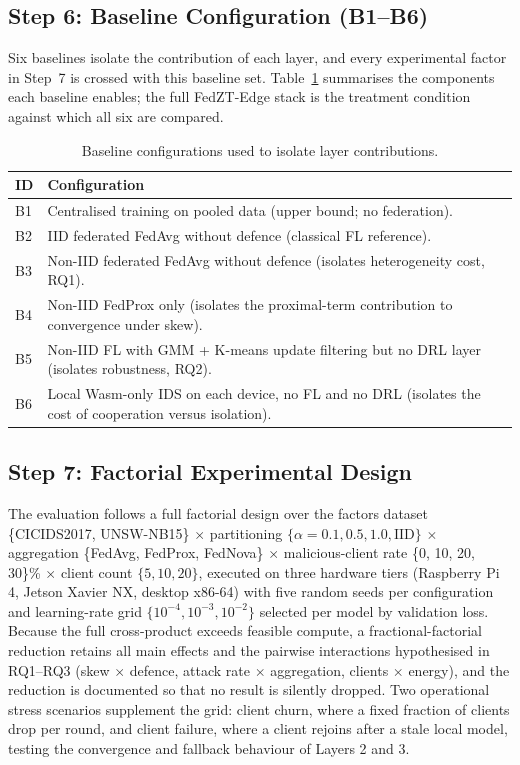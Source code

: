 \documentclass[11pt,a4paper]{article}
\begin{document}
\subsection{Step 6: Baseline Configuration (B1--B6)}\label{sec:step6}

Six baselines isolate the contribution of each layer, and every
experimental factor in Step~7 is crossed with this baseline set.
Table~\ref{tab:baselines} summarises the components each baseline enables;
the full FedZT-Edge stack is the treatment condition against which all six
are compared.

\begin{table}[htbp]
\centering
\caption{Baseline configurations used to isolate layer contributions.}
\label{tab:baselines}
\small
\begin{tabularx}{\textwidth}{lX}
\toprule
\textbf{ID} & \textbf{Configuration} \\
\midrule
B1 & Centralised training on pooled data (upper bound; no federation). \\
B2 & IID federated FedAvg without defence (classical FL reference). \\
B3 & Non-IID federated FedAvg without defence (isolates heterogeneity
cost, RQ1). \\
B4 & Non-IID FedProx only (isolates the proximal-term contribution to
convergence under skew). \\
B5 & Non-IID FL with GMM + K-means update filtering but no DRL layer
(isolates robustness, RQ2). \\
B6 & Local Wasm-only IDS on each device, no FL and no DRL (isolates the
cost of cooperation versus isolation). \\
\bottomrule
\end{tabularx}
\end{table}

\subsection{Step 7: Factorial Experimental Design}\label{sec:step7}

The evaluation follows a full factorial design over the factors dataset
\{CICIDS2017, UNSW-NB15\} $\times$ partitioning $\{\alpha = 0.1, 0.5, 1.0,
\text{IID}\}$ $\times$ aggregation \{FedAvg, FedProx, FedNova\} $\times$
malicious-client rate \{0, 10, 20, 30\}\% $\times$ client count
$\{5, 10, 20\}$, executed on three hardware tiers (Raspberry Pi 4, Jetson
Xavier NX, desktop x86-64) with five random seeds per configuration and
learning-rate grid $\{10^{-4}, 10^{-3}, 10^{-2}\}$ selected per model by
validation loss. Because the full cross-product exceeds feasible
compute, a fractional-factorial reduction retains all main effects and
the pairwise interactions hypothesised in RQ1--RQ3 (skew $\times$ defence,
attack rate $\times$ aggregation, clients $\times$ energy), and the
reduction is documented so that no result is silently dropped. Two
operational stress scenarios supplement the grid: client churn, where a
fixed fraction of clients drop per round, and client failure, where a
client rejoins after a stale local model, testing the convergence and
fallback behaviour of Layers 2 and 3.
\end{document}
